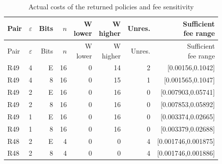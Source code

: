 {\small
\setlength{\tabcolsep}{3.5pt}
\begin{longtable}{@{}lrrrrrrr@{}}
\caption{Actual costs of the returned policies and fee sensitivity}\label{tab:direct49}\\
\toprule
Pair & $\varepsilon$ & Bits & $n$ & \shortstack{W\\lower} & \shortstack{W\\higher} & Unres. & \shortstack{Sufficient\\fee range} \\
\midrule
\endfirsthead
\toprule
Pair & $\varepsilon$ & Bits & $n$ & \shortstack{W\\lower} & \shortstack{W\\higher} & Unres. & \shortstack{Sufficient\\fee range} \\
\midrule
\endhead
\bottomrule
\endfoot
R49 & 4 & E & 16 & 0 & 14 & 2 & [0.00156,0.1042] \\
R49 & 4 & 8 & 16 & 0 & 15 & 1 & [0.001565,0.1047] \\
R49 & 2 & E & 16 & 0 & 16 & 0 & [0.007903,0.05741] \\
R49 & 2 & 8 & 16 & 0 & 16 & 0 & [0.007853,0.05892] \\
R49 & 1 & E & 16 & 0 & 16 & 0 & [0.003374,0.02665] \\
R49 & 1 & 8 & 16 & 0 & 16 & 0 & [0.003379,0.02688] \\
R48 & 2 & E & 4 & 0 & 0 & 4 & [0.001746,0.001875] \\
R48 & 2 & 8 & 4 & 0 & 0 & 4 & [0.001746,0.001886] \\
\end{longtable}
}
